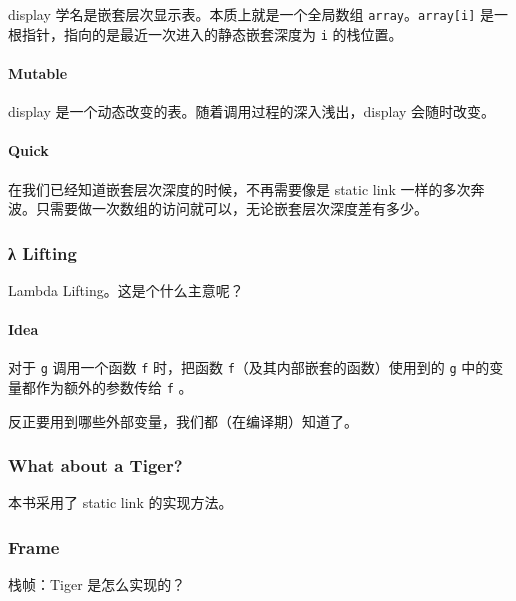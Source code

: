 \documentclass[
]{article}
\begin{document}
display 学名是嵌套层次显示表。本质上就是一个全局数组
\texttt{array}。\texttt{array{[}i{]}}
是一根指针，指向的是最近一次进入的静态嵌套深度为 \texttt{i} 的栈位置。

\hypertarget{header-n17}{%
\paragraph{Mutable}\label{header-n17}}

display 是一个动态改变的表。随着调用过程的深入浅出，display 会随时改变。

\hypertarget{header-n19}{%
\paragraph{Quick}\label{header-n19}}

在我们已经知道嵌套层次深度的时候，不再需要像是 static link
一样的多次奔波。只需要做一次数组的访问就可以，无论嵌套层次深度差有多少。

\hypertarget{header-n21}{%
\subsubsection{λ Lifting}\label{header-n21}}

Lambda Lifting。这是个什么主意呢？

\hypertarget{header-n23}{%
\paragraph{Idea}\label{header-n23}}

对于 \texttt{g} 调用一个函数 \texttt{f} 时，把函数
\texttt{f}（及其内部嵌套的函数）使用到的 \texttt{g}
中的变量都作为额外的参数传给 \texttt{f} 。

反正要用到哪些外部变量，我们都（在编译期）知道了。

\hypertarget{header-n26}{%
\subsubsection{What about a Tiger?}\label{header-n26}}

本书采用了 static link 的实现方法。

\hypertarget{header-n28}{%
\subsubsection{Frame}\label{header-n28}}

栈帧：Tiger 是怎么实现的？
\end{document}
